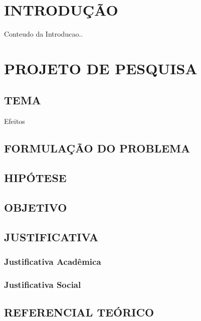 \documentclass[
	12pt,				%
	openright,			%
	oneside,			%
	a4paper,			%
	chapter=TITLE,		%
	english,			%
	french,				%
	spanish,			%
	brazil,				%
	article,			%
	]{uea-abntex2}
\begin{document}
\chapter*{\vspace*{3.4cm}INTRODUÇÃO}

Conteudo da Introducao..
\newpage
\chapter*{\vspace*{3.4cm}PROJETO DE PESQUISA}

\vspace{24pt}
\section{TEMA}
Efeitos 

\section{FORMULAÇÃO DO PROBLEMA}

\section{HIPÓTESE}

\section{OBJETIVO}

\section{JUSTIFICATIVA}

\subsection{Justificativa Acadêmica}

\subsection{Justificativa Social}

\section{REFERENCIAL TEÓRICO}
\end{document}
